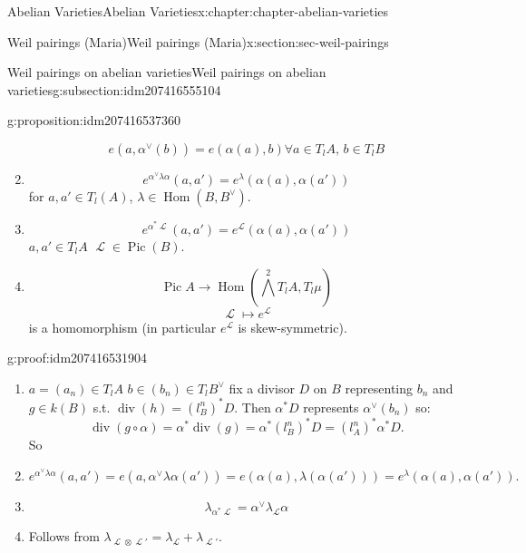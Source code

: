 \documentclass[oneside,10pt,]{book}
\numberwithin{equation}{section}
\newcommand{\sheaf}[1]{\operatorname{\mathcal{#1}}}
\DeclareMathOperator{\Hom}{Hom}
\DeclareMathOperator{\divisor}{div}
\DeclareMathOperator{\Pic}{Pic}
\begin{document}
\begin{chapterptx}{Abelian Varieties}{}{Abelian Varieties}{}{}{x:chapter:chapter-abelian-varieties}
\begin{sectionptx}{Weil pairings (Maria)}{}{Weil pairings (Maria)}{}{}{x:section:sec-weil-pairings}
\begin{subsectionptx}{Weil pairings on abelian varieties}{}{Weil pairings on abelian varieties}{}{}{g:subsection:idm207416555104}
\begin{proposition}{}{}{g:proposition:idm207416537360}
\begin{enumerate}
\begin{equation*}
e(a,\alpha^\vee(b)) = e(\alpha (a), b) \forall a \in T_lA,\,b\in T_l B
\end{equation*}
%
\item{}%
\begin{equation*}
e^{\alpha^\vee \lambda \alpha}(a,a') = e ^\lambda (\alpha(a), \alpha(a'))
\end{equation*}
for \(a,a' \in T_l(A)\), \(\lambda \in \Hom(B,B^\vee)\).%
\item{}%
\begin{equation*}
e^{\alpha^* \sheaf L} (a,a') = e^{\sheaf L}(\alpha (a),\alpha(a'))
\end{equation*}
\(a,a'\in T_lA\) \(\sheaf L\in \Pic(B)\).%
\item{}%
\begin{equation*}
\Pic A  \to \Hom( \bigwedge^2 T_lA , T_l\mu)
\end{equation*}
%
\begin{equation*}
\sheaf L \mapsto e^{\sheaf L}
\end{equation*}
is a homomorphism (in particular \(e^{\sheaf L}\) is  skew-symmetric).%
\end{enumerate}
%
\end{proposition}
\begin{proofptx}{}{g:proof:idm207416531904}
%
\begin{enumerate}
\item{}\(a = (a_n) \in T_lA\) \(b\in (b_n) \in T_l B^\vee\) fix a divisor \(D \) on \(B\) representing \(b_n\) and \(g\in k(B)\) s.t. \(\divisor (h) = (l^n_B)^* D\). Then \(\alpha^* D\) represents \(\alpha^\vee(b_n)\) so:%
\begin{equation*}
\divisor(g\circ \alpha) = \alpha^*\divisor (g) = \alpha^*(l^n_B)^* D = (l_A^n)^* \alpha^* D\text{.}
\end{equation*}
So%
\item{}%
\begin{equation*}
e^{\alpha^{\vee}\lambda \alpha} (a,a') = e(a, \alpha^\vee\lambda \alpha(a')) = e(\alpha(a),\lambda (\alpha(a'))) = e^\lambda (\alpha(a), \alpha(a'))\text{.}
\end{equation*}
%
\item{}%
\begin{equation*}
\lambda_{\alpha^* \sheaf L} = \alpha^\vee \lambda_{\sheaf L} \alpha
\end{equation*}
%
\item{}Follows from \(\lambda_{\sheaf L\otimes \sheaf L'} = \lambda_{\sheaf L} + \lambda_{\sheaf L'}\).%
\end{enumerate}

\end{proofptx}
\end{subsectionptx}
\end{sectionptx}
\end{chapterptx}
\end{document}
